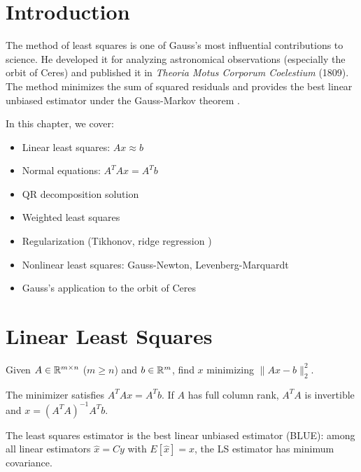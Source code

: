 \section{Introduction}

The method of least squares  is one of Gauss's most influential contributions to science. He developed it for analyzing astronomical observations (especially the orbit of Ceres) and published it in \textit{Theoria Motus Corporum Coelestium} (1809). The method minimizes the sum of squared residuals and provides the best linear unbiased estimator under the Gauss-Markov theorem .

In this chapter, we cover:
\begin{itemize}
    \item Linear least squares: $Ax \approx b$
    \item Normal equations: $A^T A x = A^T b$
    \item QR decomposition solution
    \item Weighted least squares
    \item Regularization (Tikhonov, ridge regression )
    \item Nonlinear least squares: Gauss-Newton, Levenberg-Marquardt 
    \item Gauss's application to the orbit of Ceres
\end{itemize}

\section{Linear Least Squares}

Given $A \in \mathbb{R}^{m \times n}$ ($m \ge n$) and $b \in \mathbb{R}^m$, find $x$ minimizing $\|Ax - b\|_2^2$.

\begin{theorem}
The minimizer satisfies $A^T A x = A^T b$. If $A$ has full column rank, $A^T A$ is invertible and $x = (A^T A)^{-1} A^T b$.
\end{theorem}

\begin{theorem}
The least squares estimator is the best linear unbiased estimator (BLUE): among all linear estimators $\hat{x} = Cy$ with $E[\hat{x}] = x$, the LS estimator has minimum covariance.
\end{theorem}

